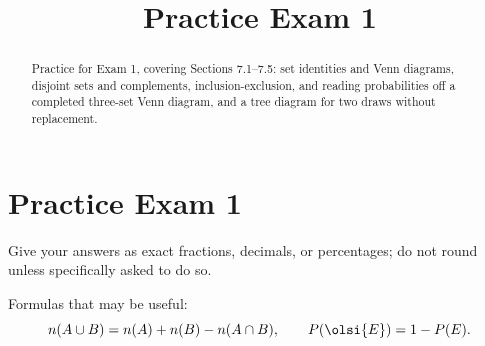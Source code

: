 \documentclass[12pt]{ximera}
\title{Practice Exam 1}
\begin{document}
\begin{abstract}
Practice for Exam 1, covering Sections 7.1--7.5: set identities and Venn diagrams,
disjoint sets and complements, inclusion-exclusion, and reading probabilities off a completed three-set Venn diagram, and a tree diagram for
two draws without replacement.
\end{abstract}
\maketitle

\section*{Practice Exam 1}

Give your answers as exact fractions, decimals, or percentages; do not round unless
specifically asked to do so.

Formulas that may be useful:
\[
n(A\cup B) = n(A) + n(B) - n(A\cap B), \qquad
P\!\left(\olsi{E}\right)=1-P(E).
\]
\end{document}
